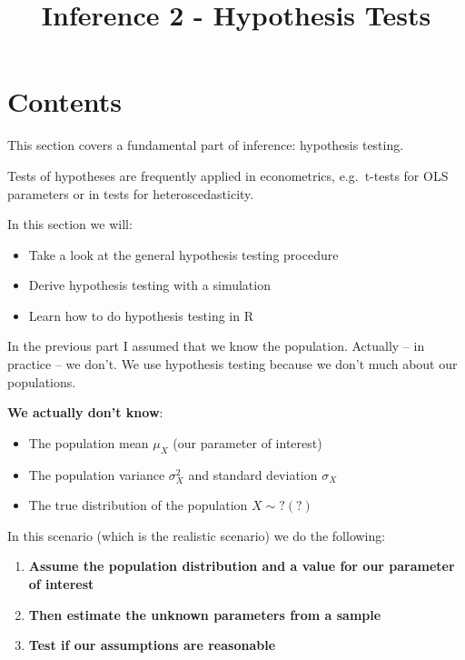 \documentclass[]{article}
\title{Inference 2 - Hypothesis Tests}
\author{}
\date{}
\providecommand{\tightlist}{%
  \setlength{\itemsep}{0pt}\setlength{\parskip}{0pt}}
\begin{document}
\maketitle

{
\setcounter{tocdepth}{2}
\tableofcontents
}
\section{Contents}\label{contents}

This section covers a fundamental part of inference: hypothesis testing.

Tests of hypotheses are frequently applied in econometrics, e.g.~t-tests
for OLS parameters or in tests for heteroscedasticity.

In this section we will:

\begin{itemize}
\tightlist
\item
  Take a look at the general hypothesis testing procedure
\item
  Derive hypothesis testing with a simulation
\item
  Learn how to do hypothesis testing in R
\end{itemize}

In the previous part I assumed that we know the population. Actually --
in practice -- we don't. We use hypothesis testing because we don't much
about our populations.

\textbf{We actually don't know}:

\begin{itemize}
\tightlist
\item
  The population mean \(\mu_X\) (our parameter of interest)
\item
  The population variance \(\sigma^2_X\) and standard deviation
  \(\sigma_X\)
\item
  The true distribution of the population \(X \sim ?(?)\)
\end{itemize}

In this scenario (which is the realistic scenario) we do the following:

\begin{enumerate}
\def\labelenumi{\arabic{enumi}.}
\tightlist
\item
  \textbf{Assume the population distribution and a value for our
  parameter of interest}
\item
  \textbf{Then estimate the unknown parameters from a sample}
\item
  \textbf{Test if our assumptions are reasonable}
\end{enumerate}
\end{document}
